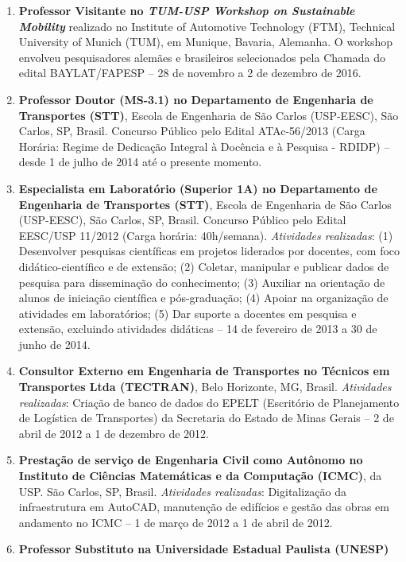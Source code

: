 \documentclass[
  brazilian,
  11pt,
  a4paper,
]{article}
\begin{document}
\begin{enumerate}
  de caracterização do comportamento de pedestres -- 17 a 28 de julho de
  2017.
\item
  \textbf{Professor Visitante no \emph{TUM-USP Workshop on Sustainable
  Mobility}} realizado no Institute of Automotive Technology (FTM),
  Technical University of Munich (TUM), em Munique, Bavaria, Alemanha. O
  workshop envolveu pesquisadores alemães e brasileiros selecionados
  pela Chamada do edital BAYLAT/FAPESP -- 28 de novembro a 2 de dezembro
  de 2016.
\item
  \textbf{Professor Doutor (MS-3.1) no Departamento de Engenharia de
  Transportes (STT)}, Escola de Engenharia de São Carlos (USP-EESC), São
  Carlos, SP, Brasil. Concurso Público pelo Edital ATAc-56/2013 (Carga
  Horária: Regime de Dedicação Integral à Docência e à Pesquisa - RDIDP)
  -- desde 1 de julho de 2014 até o presente momento.
\item
  \textbf{Especialista em Laboratório (Superior 1A) no Departamento de
  Engenharia de Transportes (STT)}, Escola de Engenharia de São Carlos
  (USP-EESC), São Carlos, SP, Brasil. Concurso Público pelo Edital
  EESC/USP 11/2012 (Carga horária: 40h/semana). \emph{Atividades
  realizadas}: (1) Desenvolver pesquisas científicas em projetos
  liderados por docentes, com foco didático-científico e de extensão;
  (2) Coletar, manipular e publicar dados de pesquisa para disseminação
  do conhecimento; (3) Auxiliar na orientação de alunos de iniciação
  científica e pós-graduação; (4) Apoiar na organização de atividades em
  laboratórios; (5) Dar suporte a docentes em pesquisa e extensão,
  excluindo atividades didáticas -- 14 de fevereiro de 2013 a 30 de
  junho de 2014.
\item
  \textbf{Consultor Externo em Engenharia de Transportes no Técnicos em
  Transportes Ltda (TECTRAN)}, Belo Horizonte, MG, Brasil.
  \emph{Atividades realizadas}: Criação de banco de dados do EPELT
  (Escritório de Planejamento de Logística de Transportes) da Secretaria
  do Estado de Minas Gerais -- 2 de abril de 2012 a 1 de dezembro de
  2012.
\item
  \textbf{Prestação de serviço de Engenharia Civil como Autônomo no
  Instituto de Ciências Matemáticas e da Computação (ICMC)}, da USP. São
  Carlos, SP, Brasil. \emph{Atividades realizadas}: Digitalização da
  infraestrutura em AutoCAD, manutenção de edifícios e gestão das obras
  em andamento no ICMC -- 1 de março de 2012 a 1 de abril de 2012.
\item
  \textbf{Professor Substituto na Universidade Estadual Paulista (UNESP)
}
\end{enumerate}
\end{document}
